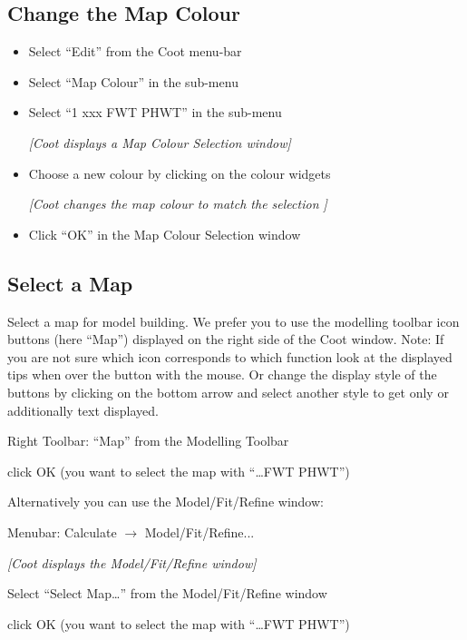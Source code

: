 \documentclass{article}
\begin{document}
\subsection{Change the Map Colour}
\begin{itemize}
\item Select \textsf{``Edit''} from the Coot menu-bar
\item Select \textsf{``Map Colour''} in the sub-menu
\item Select \textsf{``1 xxx FWT PHWT''} in the sub-menu

\textsl{ [Coot displays a Map Colour Selection window]}

\item Choose a new colour by clicking on the colour widgets

\textsl{ [Coot changes the map colour to match the selection ]}

\item Click \textsf{``OK''} in the Map Colour Selection window

\end{itemize}

\subsection{Select a Map}
Select a map for model building. We prefer you to use the modelling toolbar
icon buttons (here ``Map'') displayed on the right side of the Coot window.
Note: If you are not sure which icon corresponds to which function look at
the displayed tips when over the button with the mouse. Or change
the display style of the buttons by clicking on the bottom arrow and
select another style to get only or additionally text displayed.

\begin{trivlist}

\item Right Toolbar: \textsf{``Map''} from the Modelling Toolbar

\item click OK (you want to select the map with ``\ldots FWT PHWT'')

\end{trivlist}

Alternatively you can use the Model/Fit/Refine window:

\begin{trivlist}

\item Menubar: \textsf{Calculate $\rightarrow$ Model/Fit/Refine...}

\textsl{ [Coot displays the Model/Fit/Refine window]}

\item Select \textsf{``Select Map\ldots''} from the Model/Fit/Refine
  window

\item click OK (you want to select the map with ``\ldots FWT PHWT'')

\end{trivlist}
\end{document}
